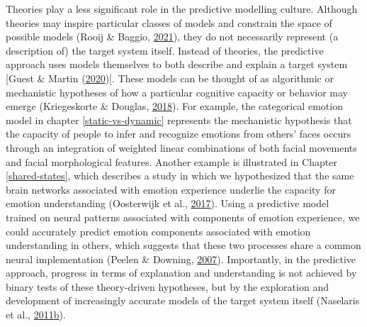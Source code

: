 \documentclass[11pt,american,]{memoir} %
\begin{document}
Theories play a less significant role in the predictive modelling culture. Although theories may inspire particular classes of models and constrain the space of possible models (Rooij \& Baggio, \protect\hyperlink{ref-Van_Rooij2021-bk}{2021}), they do not necessarily represent (a description of) the target system itself. Instead of theories, the predictive approach uses models themselves to both describe and explain a target system {[}Guest \& Martin (\protect\hyperlink{ref-Guest2020-ef}{2020}){[}. These models can be thought of as algorithmic or mechanistic hypotheses of how a particular cognitive capacity or behavior may emerge (Kriegeskorte \& Douglas, \protect\hyperlink{ref-Kriegeskorte2018-om}{2018}). For example, the categorical emotion model in chapter \ref{static-vs-dynamic} represents the mechanistic hypothesis that the capacity of people to infer and recognize emotions from others' faces occurs through an integration of weighted linear combinations of both facial movements and facial morphological features. Another example is illustrated in Chapter \ref{shared-states}, which describes a study in which we hypothesized that the same brain networks associated with emotion experience underlie the capacity for emotion understanding (Oosterwijk et al., \protect\hyperlink{ref-Oosterwijk2017-sc}{2017}). Using a predictive model trained on neural patterns associated with components of emotion experience, we could accurately predict emotion components associated with emotion understanding in others, which suggests that these two processes share a common neural implementation (Peelen \& Downing, \protect\hyperlink{ref-Peelen2007-ew}{2007}). Importantly, in the predictive approach, progress in terms of explanation and understanding is not achieved by binary tests of these theory-driven hypotheses, but by the exploration and development of increasingly accurate models of the target system itself (Naselaris et al., \protect\hyperlink{ref-Naselaris2011-oh}{2011}\protect\hyperlink{ref-Naselaris2011-oh}{b}).
\end{document}
